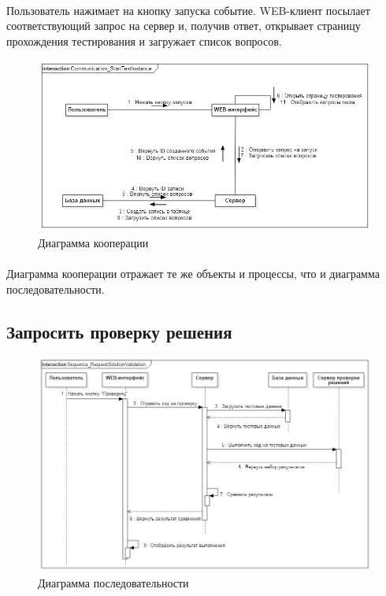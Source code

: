 \documentclass{article}
\begin{document}
        \paragraph{}
        Пользователь нажимает на кнопку запуска событие. WEB-клиент посылает
        соответствующий запрос на сервер и, получив ответ, открывает страницу
        прохождения тестирования и загружает список вопросов.
        \begin{figure}[H]
            \includegraphics[width=\textwidth, center]
                {Communication_StartTestInstance}
            \caption{Диаграмма кооперации}
        \end{figure}
        \paragraph{}
        Диаграмма кооперации отражает те же объекты и процессы, что и диаграмма
        последовательности.
    
    
    \subsection{Запросить проверку решения}
        \begin{figure}[H]
            \includegraphics[width=\textwidth, center]
                {Sequence_RequestSolutionValidation}
            \caption{Диаграмма последовательности}
        \end{figure}
\end{document}
